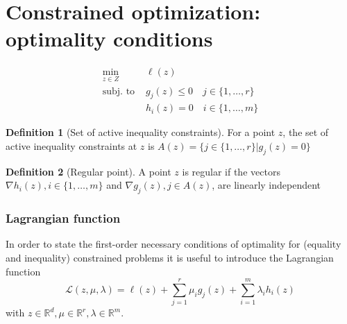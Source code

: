 \documentclass[openany]{book}
\newcommand{\R}{\mathbb{R}}               %
\theoremstyle{definition}
\newtheorem{definition}{Definition}[section]
\theoremstyle{remark}
\begin{document}
\section{Constrained optimization: optimality conditions}

\begin{align*}
    \min_{z\in Z}\  &\ell(z)\\
    \text{subj. to } & g_j(z)\leq 0 \quad j\in\{1,\dots,r\}\\
    & h_i(z)=0 \quad i\in\{1,\dots,m\}
\end{align*}

\begin{definition}[Set of active inequality constraints]
    For a point $z$, the set of active inequality constraints at $z$ is $A(z) = \{j\in\{1,\dots,r\}|g_j(z)=0\}$
\end{definition}
\begin{definition}[Regular point]
    A point $z$ is regular if the vectors $\nabla h_i(z), i\in \{1,\dots,m\}$ and $\nabla g_j(z), j\in A(z)$, are linearly independent
\end{definition}

\subsubsection{Lagrangian function}

In order to state the first-order necessary conditions of optimality for (equality and inequality) constrained problems it is useful to introduce the Lagrangian function 
\[
    \mathcal{L}(z,\mu,\lambda)=\ell(z)+\displaystyle\sum_{j=1}^{r}\mu_ig_j(z) + \displaystyle\sum_{i=1}^{m}\lambda_i h_i(z)
\]
with $z \in \R^d, \mu\in\R^r,\lambda\in\R^m$.
\end{document}
